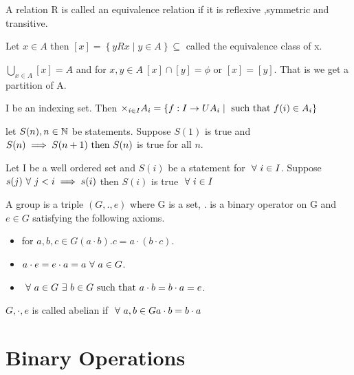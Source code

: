 \documentclass{book}
\begin{document}
\begin{definition}
  A relation R is called an equivalence relation if it is reflexive ,symmetric and transitive.
\end{definition}
\begin{definition}
  Let \(x \in A\) then \([x]= \left\{ yRx \mid y \in A   \right\} \subseteq \) called the equivalence class of x.
\end{definition}
\begin{definition}
  \(\bigcup_{x \in A}[x]= A \) and for \(x,y \in A \ [x] \cap [y] = \phi  \text{ or } [x]=[y]\). That is we get a partition of A.
\end{definition}
\begin{axiom}
  I be an indexing set. Then \( \times _{i \in I}A_i = \left\{ f: I \to UA_i \mid \text{ such that } f(i) \in A_i \right\}    \)
\end{axiom}
\begin{definition}
  let \(S(n), n \in \mathbb{N } \) be statements. Suppose \(S(1  )\) is true and \(S(n)  \implies S(n+1) \text{ then } S(n) \) is true for all \(n\).
\end{definition}
\begin{definition}
  Let I be a well ordered set and \(S(i)\) be a statement for \(\ \forall \  i \in I\). Suppose \(s(j) \ \forall \  j < i  \implies s(i)\) then \(S(i)\) is true \(\ \forall \  i \in I\)
\end{definition}

\begin{definition}[Group]
  A group is a triple \((G,.,e)\) where G is a set, \(.\) is a binary operator on G and \(e \in G\) satisfying the following axioms.
  \begin{itemize}
    \item for \(a,b,c \in G  (a \cdot b).c = a\cdot(b\cdot c)\).
    \item \(a \cdot e =  e \cdot a = a \ \forall \  a \in G\).
    \item \(\ \forall \  a \in G \ \exists \ b \in G \text{ such that } a \cdot b = b \cdot a= e \).
  \end{itemize}

\end{definition}

\begin{definition}
  \(G, \cdot , e \) is called abelian if \(\ \forall \  a,b \in G a \cdot b = b \cdot a\)
\end{definition}

\section{Binary Operations}
\end{document}
